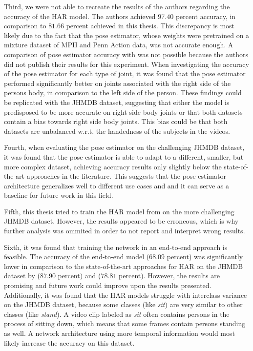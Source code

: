 Third, we were not able to recreate the results of the authors regarding the accuracy of the HAR model.
The authors achieved $97.40$ percent accuracy, in comparison to $81.66$ percent achieved in this thesis.
This discrepancy is most likely due to the fact that the pose estimator, whose weights were pretrained on a mixture dataset of MPII and Penn Action data, was not accurate enough.
A comparison of pose estimator accuracy with \cite{luvizon_2d/3d_2018} was not possible because the authors did not publish their results for this experiment.
When investigating the accuracy of the pose estimator for each type of joint, it was found that the pose estimator performed significantly better on joints associated with the right side of the persons body, in comparison to the left side of the person.
These findings could be replicated with the JHMDB dataset, suggesting that either the model is predisposed to be more accurate on right side body joints or that both datasets contain a bias towards right side body joints.
This bias could be that both datasets are unbalanced w.r.t. the handedness of the subjects in the videos.

Fourth, when evaluating the pose estimator on the challenging JHMDB dataset, it was found that the pose estimator is able to adapt to a different, smaller, but more complex dataset, achieving accuracy results only slightly below the state-of-the-art approaches in the literature.
This suggests that the pose estimator architecture generalizes well to different use cases and and it can serve as a baseline for future work in this field.

Fifth, this thesis tried to train the HAR model from \cite{luvizon_2d/3d_2018} on the more challenging JHMDB dataset.
However, the results appeared to be erroneous, which is why further analysis was ommited in order to not report and interpret wrong results.

Sixth, it was found that training the network in an end-to-end approach is feasible.
The accuracy of the end-to-end model ($68.09$ percent) was significantly lower in comparison to the state-of-the-art approaches for HAR on the JHMDB dataset by \cite{choutas_potion:_2018} ($87.90$ percent) and \cite{khalid_multi-modal_2018} ($78.81$ percent).
However, the results are promising and future work could improve upon the results presented.
Additionally, it was found that the HAR models struggle with interclass variance on the JHMDB dataset, because some classes (like \textit{sit}) are very similar to other classes (like \textit{stand}).
A video clip labeled as \textit{sit} often contains persons in the process of sitting down, which means that some frames contain persons standing as well.
A network architecture using more temporal information would most likely increase the accuracy on this dataset.

